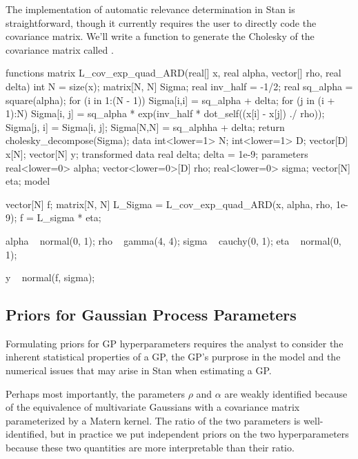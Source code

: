 The implementation of automatic relevance determination in Stan is
straightforward, though it currently requires the user to directly code the
covariance matrix. We'll write a function to generate the Cholesky of the
covariance matrix called .

%
\begin{stancode}
functions { 
  matrix L_cov_exp_quad_ARD(real[] x,
                            real alpha,
                            vector[] rho,
                            real delta) {
    int N = size(x);
    matrix[N, N] Sigma;
    real inv_half = -1/2;
    real sq_alpha = square(alpha);
    for (i in 1:(N - 1)) {
      Sigma[i,i] = sq_alpha + delta;
      for (j in (i + 1):N) {
        Sigma[i, j] = sq_alpha
                      * exp(inv_half 
                            * dot_self((x[i] - x[j]) ./ rho));
        Sigma[j, i] = Sigma[i, j];
      }
    }
    Sigma[N,N] = sq_alphha + delta;
    return cholesky_decompose(Sigma);
  }
}
data {
  int<lower=1> N;
  int<lower=1> D;
  vector[D] x[N];
  vector[N] y;
}
transformed data {
  real delta;
  delta = 1e-9;
}
parameters {
  real<lower=0> alpha;
  vector<lower=0>[D] rho;
  real<lower=0> sigma;
  vector[N] eta;
}
model {
  vector[N] f;
  {
    matrix[N, N] L_Sigma = L_cov_exp_quad_ARD(x, alpha, rho, 1e-9);
    f = L_sigma * eta;
  }

  alpha ~ normal(0, 1);
  rho ~ gamma(4, 4);
  sigma ~ cauchy(0, 1);
  eta ~ normal(0, 1);

  y ~ normal(f, sigma);
}
\end{stancode}
%

\subsection{Priors for Gaussian Process Parameters}

Formulating priors for GP hyperparameters requires the analyst to consider the
inherent statistical properties of a GP, the GP's purprose in the model and the
numerical issues that may arise in Stan when estimating a GP. 

Perhaps most importantly, the parameters $\rho$ and $\alpha$ are weakly
identified because of the equivalence of multivariate Gaussians with a
covariance matrix parameterized by a Matern kernel. The ratio of the two
parameters is well-identified, but in practice we put independent priors on the
two hyperparameters because these two quantities are more interpretable than
their ratio. 

